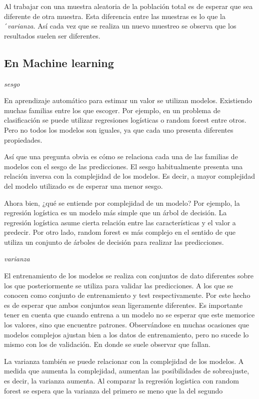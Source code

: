 \documentclass[
]{article}
\begin{document}
Al trabajar con una muestra aleatoria de la población total es de
esperar que sea diferente de otra muestra. Esta diferencia entre las
muestras es lo que la ´\emph{varianza}. Así cada vez que se realiza un
nuevo muestreo se observa que los resultados suelen ser diferentes.

\hypertarget{en-machine-learning}{%
\subsection{En Machine learning}\label{en-machine-learning}}

\emph{sesgo}

En aprendizaje automático para estimar un valor se utilizan modelos.
Existiendo muchas familias entre los que escoger. Por ejemplo, en un
problema de clasificación se puede utilizar regresiones logísticas o
random forest entre otros. Pero no todos los modelos son iguales, ya que
cada uno presenta diferentes propiedades.

Así que una pregunta obvia es cómo se relaciona cada una de las familias
de modelos con el sesgo de las predicciones. El sesgo habitualmente
presenta una relación inversa con la complejidad de los modelos. Es
decir, a mayor complejidad del modelo utilizado es de esperar una menor
sesgo.

Ahora bien, ¿qué se entiende por complejidad de un modelo? Por ejemplo,
la regresión logística es un modelo más simple que un árbol de decisión.
La regresión logística asume cierta relación entre las características y
el valor a predecir. Por otro lado, random forest es más complejo en el
sentido de que utiliza un conjunto de árboles de decisión para realizar
las predicciones.

\emph{varianza}

El entrenamiento de los modelos se realiza con conjuntos de dato
diferentes sobre los que posteriormente se utiliza para validar las
predicciones. A los que se conocen como conjunto de entrenamiento y test
respectivamente. Por este hecho es de esperar que ambos conjuntos sean
ligeramente diferentes. Es importante tener en cuenta que cuando entrena
a un modelo no se esperar que este memorice los valores, sino que
encuentre patrones. Observándose en muchas ocasiones que modelos
complejos ajustan bien a los datos de entrenamiento, pero no sucede lo
mismo con los de validación. En donde se suele observar que fallan.

La varianza también se puede relacionar con la complejidad de los
modelos. A medida que aumenta la complejidad, aumentan las posibilidades
de sobreajuste, es decir, la varianza aumenta. Al comparar la regresión
logística con random forest se espera que la varianza del primero se
meno que la del segundo
\end{document}
